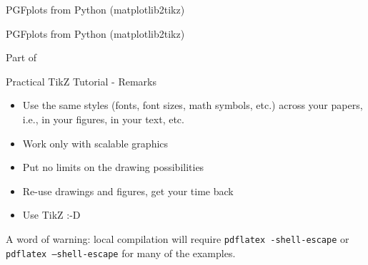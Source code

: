 \documentclass[aspectratio=169]{beamer}
\begin{document}
\begin{frame}{PGFplots from Python (matplotlib2tikz)}
\end{frame}

\begin{frame}{PGFplots from Python (matplotlib2tikz)}
    
    
    \footnotesize Part of 
\end{frame}

\begin{frame}{Practical TikZ Tutorial - Remarks}
    \begin{itemize}
        \item Use the same styles (fonts, font sizes, math symbols, etc.) across your papers, i.e., in your figures, in your text, etc.
        \item Work only with scalable graphics
        \item Put no limits on the drawing possibilities
        \item Re-use drawings and figures, get your time back
        \item Use TikZ :-D
    \end{itemize}
    A word of warning: local compilation will require \texttt{pdflatex -shell-escape} or \texttt{pdflatex --shell-escape} for many of the examples.
\end{frame}
\end{document}
